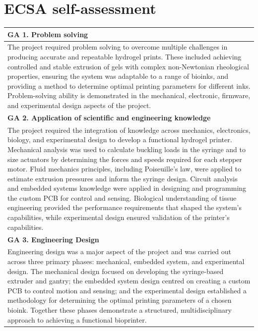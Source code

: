\chapter*{ECSA self-assessment}

\renewcommand{\arraystretch}{1.5}
\begin{center}
\begin{longtable}{|m{\textwidth}|}
\hline

\textbf{GA 1. Problem solving} \\
\hline    
The project required problem solving to overcome multiple challenges in producing accurate and repeatable hydrogel prints. These included achieving controlled and stable extrusion of gels with complex non-Newtonian rheological properties, ensuring the system was adaptable to a range of bioinks, and providing a method to determine optimal printing parameters for different inks. Problem-solving ability is demonstrated in the mechanical, electronic, firmware, and experimental design aspects of the project. \\
\hline    

\textbf{GA 2. Application of scientific and engineering knowledge} \\
\hline    
The project required the integration of knowledge across mechanics, electronics, biology, and experimental design to develop a functional hydrogel printer. Mechanical analysis was used to calculate buckling loads in the syringe and to size actuators by determining the forces and speeds required for each stepper motor. Fluid mechanics principles, including Poiseuille’s law, were applied to estimate extrusion pressures and inform the syringe design. Circuit analysis and embedded systems knowledge were applied in designing and programming the custom PCB for control and sensing. Biological understanding of tissue engineering provided the performance requirements that shaped the system’s capabilities, while experimental design ensured validation of the printer's capabilities. \\
\hline    

\textbf{GA 3. Engineering Design} \\
\hline    
Engineering design was a major aspect of the project and was carried out across three primary phases: mechanical, embedded system, and experimental design. The mechanical design focused on developing the syringe-based extruder and gantry; the embedded system design centred on creating a custom PCB to control motion and sensing; and the experimental design established a methodology for determining the optimal printing parameters of a chosen bioink. Together these phases demonstrate a structured, multidisciplinary approach to achieving a functional bioprinter. \\
\hline    


\end{longtable}
\end{center}
